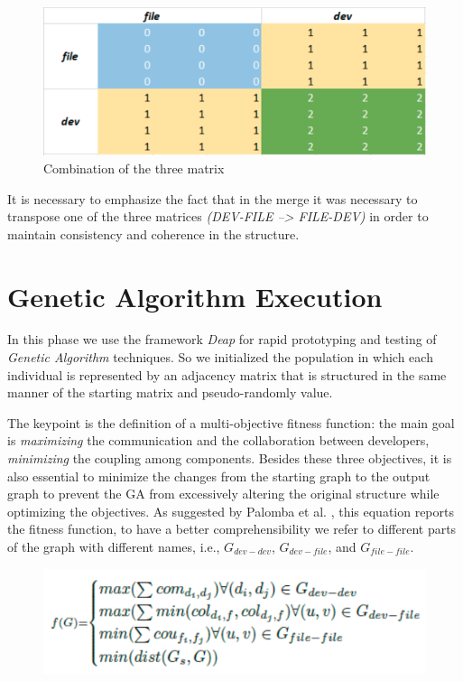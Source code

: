 \documentclass[sigconf]{acmart}
\begin{document}
\begin{figure}[h]
  \centering
  \includegraphics[width=\linewidth]{img_1}
  \caption{Combination of the three matrix}
  \Description{}
\end{figure}

It is necessary to emphasize the fact that in the merge it was necessary to transpose one of the three matrices {\itshape (DEV-FILE --> FILE-DEV) } in order to maintain consistency and coherence in the structure.

\section{Genetic Algorithm Execution}

In this phase we use the framework {\itshape Deap} for rapid prototyping and testing of {\itshape Genetic Algorithm} techniques. So we initialized the population in which each individual is represented by an adjacency matrix that is structured in the same manner of the starting matrix and pseudo-randomly value.

The keypoint is the definition of a multi-objective fitness function: the main goal is \textit{maximizing} the communication and the collaboration between developers, \textit{minimizing} the coupling among components. Besides these three objectives, it is also essential to minimize the changes from the starting graph to the output graph to prevent the GA from excessively altering the original structure while optimizing the objectives. As suggested by Palomba et al. \cite{palomba1}, this equation reports the fitness function, to have a better comprehensibility we refer to different parts of the graph with different names, i.e., $G_{dev-dev}$, $G_{dev-file}$, and $G_{file-file}$.

\begin{figure}[h]
  \centering
  \includegraphics[width=\linewidth]{img_5}
  \Description{}
\end{figure}
\end{document}
